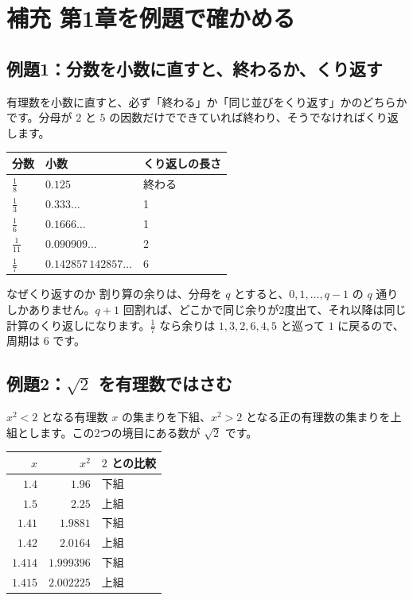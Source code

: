 \documentclass[a4paper,11pt,openany]{ltjsbook}
\begin{document}
\section{補充 第1章を例題で確かめる}

\subsection*{例題1：分数を小数に直すと、終わるか、くり返す}

有理数を小数に直すと、必ず「終わる」か「同じ並びをくり返す」かのどちらかです。分母が $2$ と $5$ の因数だけでできていれば終わり、そうでなければくり返します。

\begin{center}
\begin{tabular}{lll}
\toprule
分数 & 小数 & くり返しの長さ\\
\midrule
$\frac18$ & $0.125$ & 終わる\\
$\frac13$ & $0.333\ldots$ & 1\\
$\frac16$ & $0.1666\ldots$ & 1\\
$\frac1{11}$ & $0.090909\ldots$ & 2\\
$\frac17$ & $0.142857\,142857\ldots$ & 6\\
\bottomrule
\end{tabular}
\end{center}

\begin{examplebox}{なぜくり返すのか}
割り算の余りは、分母を $q$ とすると、$0,1,\ldots,q-1$ の $q$ 通りしかありません。$q+1$ 回割れば、どこかで同じ余りが2度出て、それ以降は同じ計算のくり返しになります。$\frac17$ なら余りは $1,3,2,6,4,5$ と巡って $1$ に戻るので、周期は $6$ です。
\end{examplebox}

\subsection*{例題2：$\sqrt2$ を有理数ではさむ}

$x^2<2$ となる有理数 $x$ の集まりを下組、$x^2>2$ となる正の有理数の集まりを上組とします。この2つの境目にある数が $\sqrt2$ です。

\begin{center}
\begin{tabular}{rrl}
\toprule
$x$ & $x^2$ & $2$ との比較\\
\midrule
$1.4$ & $1.96$ & 下組\\
$1.5$ & $2.25$ & 上組\\
$1.41$ & $1.9881$ & 下組\\
$1.42$ & $2.0164$ & 上組\\
$1.414$ & $1.999396$ & 下組\\
$1.415$ & $2.002225$ & 上組\\
\bottomrule
\end{tabular}
\end{center}
\end{document}
